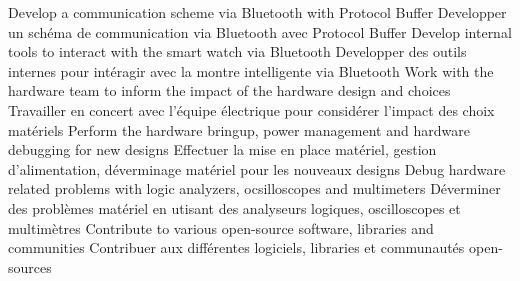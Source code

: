                 \resumeItemEnFr
                    {Develop a communication scheme via Bluetooth with Protocol Buffer}
                    {Developper un schéma de communication via Bluetooth avec Protocol Buffer}
                \resumeItemEnFr
                    {Develop internal tools to interact with the smart watch via Bluetooth}
                    {Developper des outils internes pour intéragir avec la montre intelligente via Bluetooth}
                \resumeItemEnFr
                    {Work with the hardware team to inform the impact of the hardware design and choices}
                    {Travailler en concert avec l'équipe électrique pour considérer l'impact des choix matériels}
                \resumeItemEnFr
                    {Perform the hardware bringup, power management and hardware debugging for new designs}
                    {Effectuer la mise en place matériel, gestion d'alimentation, déverminage matériel pour les nouveaux designs}
                \resumeItemEnFr
                    {Debug hardware related problems with logic analyzers, ocsilloscopes and multimeters}
                    {Déverminer des problèmes matériel en utisant des analyseurs logiques, oscilloscopes et multimètres}
                \resumeItemEnFr
                    {Contribute to various open-source software, libraries and communities}
                    {Contribuer aux différentes logiciels, libraries et communautés open-sources}
            \resumeItemListEnd
    \resumeSubHeadingListEnd

